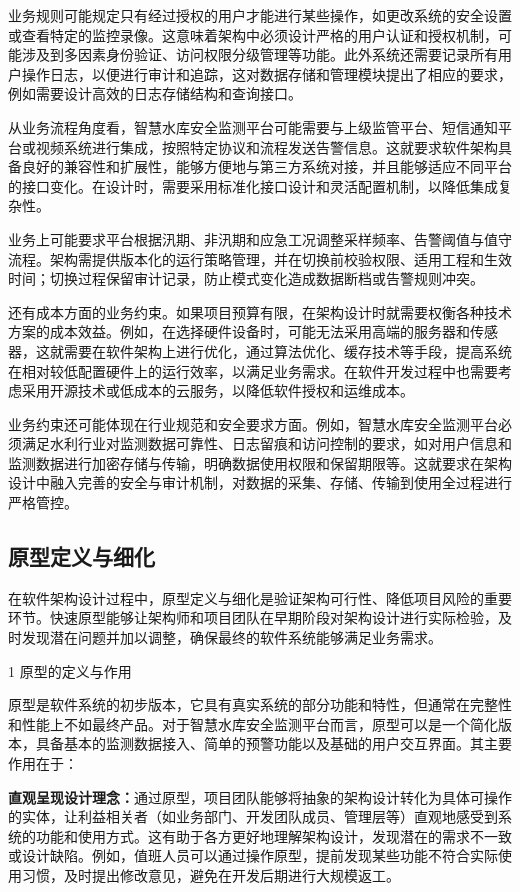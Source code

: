 业务规则可能规定只有经过授权的用户才能进行某些操作，如更改系统的安全设置或查看特定的监控录像。这意味着架构中必须设计严格的用户认证和授权机制，可能涉及到多因素身份验证、访问权限分级管理等功能。此外系统还需要记录所有用户操作日志，以便进行审计和追踪，这对数据存储和管理模块提出了相应的要求，例如需要设计高效的日志存储结构和查询接口。

从业务流程角度看，智慧水库安全监测平台可能需要与上级监管平台、短信通知平台或视频系统进行集成，按照特定协议和流程发送告警信息。这就要求软件架构具备良好的兼容性和扩展性，能够方便地与第三方系统对接，并且能够适应不同平台的接口变化。在设计时，需要采用标准化接口设计和灵活配置机制，以降低集成复杂性。

业务上可能要求平台根据汛期、非汛期和应急工况调整采样频率、告警阈值与值守流程。架构需提供版本化的运行策略管理，并在切换前校验权限、适用工程和生效时间；切换过程保留审计记录，防止模式变化造成数据断档或告警规则冲突。

还有成本方面的业务约束。如果项目预算有限，在架构设计时就需要权衡各种技术方案的成本效益。例如，在选择硬件设备时，可能无法采用高端的服务器和传感器，这就需要在软件架构上进行优化，通过算法优化、缓存技术等手段，提高系统在相对较低配置硬件上的运行效率，以满足业务需求。在软件开发过程中也需要考虑采用开源技术或低成本的云服务，以降低软件授权和运维成本。

业务约束还可能体现在行业规范和安全要求方面。例如，智慧水库安全监测平台必须满足水利行业对监测数据可靠性、日志留痕和访问控制的要求，如对用户信息和监测数据进行加密存储与传输，明确数据使用权限和保留期限等。这就要求在架构设计中融入完善的安全与审计机制，对数据的采集、存储、传输到使用全过程进行严格管控。

\subsection{原型定义与细化}

在软件架构设计过程中，原型定义与细化是验证架构可行性、降低项目风险的重要环节。快速原型能够让架构师和项目团队在早期阶段对架构设计进行实际检验，及时发现潜在问题并加以调整，确保最终的软件系统能够满足业务需求。

1 原型的定义与作用

原型是软件系统的初步版本，它具有真实系统的部分功能和特性，但通常在完整性和性能上不如最终产品。对于智慧水库安全监测平台而言，原型可以是一个简化版本，具备基本的监测数据接入、简单的预警功能以及基础的用户交互界面。其主要作用在于：

\textbf{直观呈现设计理念：}通过原型，项目团队能够将抽象的架构设计转化为具体可操作的实体，让利益相关者（如业务部门、开发团队成员、管理层等）直观地感受到系统的功能和使用方式。这有助于各方更好地理解架构设计，发现潜在的需求不一致或设计缺陷。例如，值班人员可以通过操作原型，提前发现某些功能不符合实际使用习惯，及时提出修改意见，避免在开发后期进行大规模返工。


